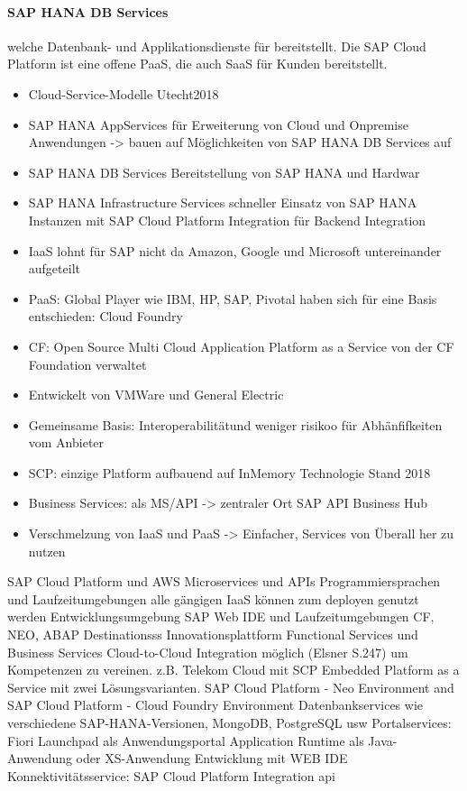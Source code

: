 \paragraph{SAP HANA DB Services}
 welche Datenbank- und Applikationsdienste für bereitstellt.
Die SAP Cloud Platform ist eine offene PaaS, die auch SaaS für Kunden bereitstellt.

\begin{itemize}
  \item Cloud-Service-Modelle Utecht2018
  \item SAP HANA AppServices für Erweiterung von Cloud und Onpremise Anwendungen -> bauen auf Möglichkeiten von SAP HANA DB Services auf
  \item SAP HANA DB Services Bereitstellung von SAP HANA und Hardwar
  \item SAP HANA Infrastructure Services schneller Einsatz von SAP HANA Instanzen mit SAP Cloud Platform Integration für Backend Integration
  \item IaaS lohnt für SAP nicht da Amazon, Google und Microsoft untereinander aufgeteilt
  \item PaaS: Global Player wie IBM, HP, SAP, Pivotal haben sich für eine Basis entschieden: Cloud Foundry
  \item CF: Open Source Multi Cloud Application Platform as a Service von der CF Foundation verwaltet
  \item Entwickelt von VMWare und General Electric
  \item Gemeinsame Basis: Interoperabilitätund weniger risikoo für Abhänfifkeiten vom Anbieter
  \item SCP: einzige Platform aufbauend auf InMemory Technologie Stand 2018
  \item Business Services: als MS/API -> zentraler Ort SAP API Business Hub
  \item Verschmelzung von IaaS und PaaS -> Einfacher, Services von Überall her zu nutzen
\end{itemize}




SAP Cloud Platform und AWS Microservices und APIs
Programmiersprachen und Laufzeitumgebungen
alle gängigen IaaS können zum deployen genutzt werden
Entwicklungsumgebung SAP Web IDE und Laufzeitumgebungen
CF, NEO, ABAP
Destinationsss
Innovationsplattform
Functional Services und Business Services
Cloud-to-Cloud Integration möglich (Elsner S.247) um Kompetenzen zu vereinen. z.B. Telekom Cloud mit SCP
Embedded Platform as a Service mit zwei Lösungsvarianten. SAP Cloud Platform - Neo Environment and SAP Cloud Platform - Cloud Foundry Environment
Datenbankservices wie verschiedene SAP-HANA-Versionen, MongoDB, PostgreSQL usw
Portalservices: Fiori Launchpad als Anwendungsportal
Application Runtime als Java-Anwendung oder XS-Anwendung Entwicklung mit WEB IDE
Konnektivitätsservice: SAP Cloud Platform Integration
\ac{api}

